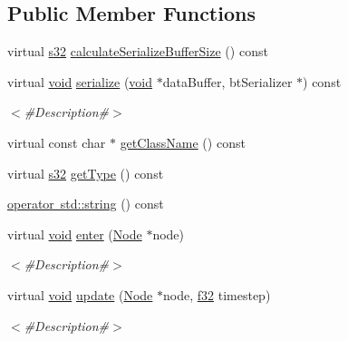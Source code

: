 \subsection*{Public Member Functions}
\begin{DoxyCompactItemize}
\item 
virtual \mbox{\hyperlink{_util_8h_aa62c75d314a0d1f37f79c4b73b2292e2}{s32}} \mbox{\hyperlink{classnjli_1_1_node_state_afaf6f0ecbc077af2003c6fba3eb81eff}{calculate\+Serialize\+Buffer\+Size}} () const
\item 
virtual \mbox{\hyperlink{_thread_8h_af1e856da2e658414cb2456cb6f7ebc66}{void}} \mbox{\hyperlink{classnjli_1_1_node_state_a6383632da2585bd7da2c12216df1f18a}{serialize}} (\mbox{\hyperlink{_thread_8h_af1e856da2e658414cb2456cb6f7ebc66}{void}} $\ast$data\+Buffer, bt\+Serializer $\ast$) const
\begin{DoxyCompactList}\small\item\em $<$\#\+Description\#$>$ \end{DoxyCompactList}\item 
virtual const char $\ast$ \mbox{\hyperlink{classnjli_1_1_node_state_aac4612e5bc3e6a5c4a361e593157723c}{get\+Class\+Name}} () const
\item 
virtual \mbox{\hyperlink{_util_8h_aa62c75d314a0d1f37f79c4b73b2292e2}{s32}} \mbox{\hyperlink{classnjli_1_1_node_state_a58607b67974806152c3483b40786b2de}{get\+Type}} () const
\item 
\mbox{\hyperlink{classnjli_1_1_node_state_a9565c2a4a62f9ee0093da373fcbd716a}{operator std\+::string}} () const
\item 
virtual \mbox{\hyperlink{_thread_8h_af1e856da2e658414cb2456cb6f7ebc66}{void}} \mbox{\hyperlink{classnjli_1_1_node_state_ae2e27ccb73406c40bd502c5684bf62b0}{enter}} (\mbox{\hyperlink{classnjli_1_1_node}{Node}} $\ast$node)
\begin{DoxyCompactList}\small\item\em $<$\#\+Description\#$>$ \end{DoxyCompactList}\item 
virtual \mbox{\hyperlink{_thread_8h_af1e856da2e658414cb2456cb6f7ebc66}{void}} \mbox{\hyperlink{classnjli_1_1_node_state_a627419875be255906b52e08d63fe61a3}{update}} (\mbox{\hyperlink{classnjli_1_1_node}{Node}} $\ast$node, \mbox{\hyperlink{_util_8h_a5f6906312a689f27d70e9d086649d3fd}{f32}} timestep)
\begin{DoxyCompactList}\small\item\em $<$\#\+Description\#$>$ \end{DoxyCompactList}\item 

\end{DoxyCompactItemize}
